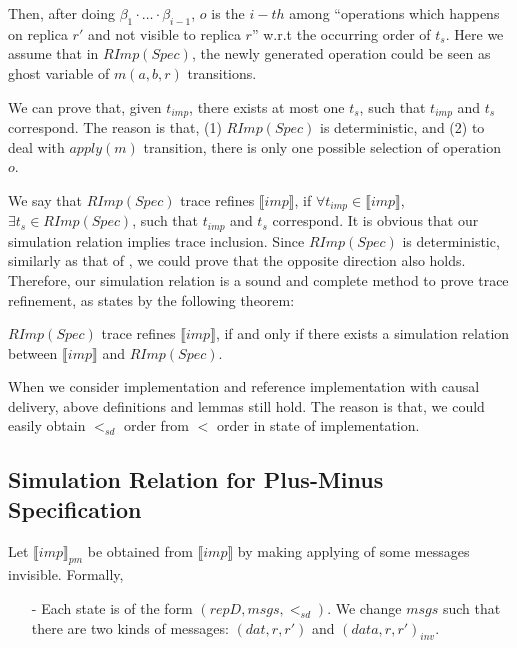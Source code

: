 {\begin{itemize}
    Then, after doing $\beta_1 \cdot \ldots \cdot \beta_{i-1}$, $o$ is the $i-th$ among ``operations which happens on replica $r'$ and not visible to replica $r$'' w.r.t the occurring order of $t_s$. {\color {red} Here we assume that in $RImp(Spec)$, the newly generated operation could be seen as ghost variable of $m(a,b,r)$ transitions.}
\end{itemize}

We can prove that, given $t_{imp}$, there exists at most one $t_s$, such that $t_{imp}$ and $t_s$ correspond. The reason is that, (1) $RImp(Spec)$ is deterministic, and (2) to deal with $apply(m)$ transition, there is only one possible selection of operation $o$.

We say that $RImp(Spec)$ trace refines $\llbracket imp \rrbracket$, if $\forall t_{imp} \in \llbracket imp \rrbracket$, $\exists t_s \in RImp(Spec)$, such that $t_{imp}$ and $t_s$ correspond. It is obvious that our simulation relation implies trace inclusion. Since $RImp(Spec)$ is deterministic, similarly as that of \cite{Abadi:1991,Lynch:1995}, we could prove that the opposite direction also holds. Therefore, our simulation relation is a sound and complete method to prove trace refinement, as states by the following theorem:

\begin{theorem}
\label{theorem:equivalence of our simulation relation and sequence inclusion}
$RImp(Spec)$ trace refines $\llbracket imp \rrbracket$, if and only if there exists a simulation relation between $\llbracket imp \rrbracket$ and $RImp(Spec)$.
\end{theorem}



When we consider implementation and reference implementation with causal delivery, above definitions and lemmas still hold. The reason is that, we could easily obtain $<_{sd}$ order from $<$ order in state of implementation.




\subsection{Simulation Relation for Plus-Minus Specification}
\label{subsec:simulation relation for plus-minus specification}

Let $\llbracket imp \rrbracket_{pm}$ be obtained from $\llbracket imp \rrbracket$ by making applying of some messages invisible. Formally,

\begin{itemize}
\setlength{\itemsep}{0.5pt}
\item[-] Each state is of the form $(repD,msgs,<_{sd})$. We change $msgs$ such that there are two kinds of messages: $(dat,r,r')$ and $(data,r,r')_{inv}$.


\end{itemize}}
